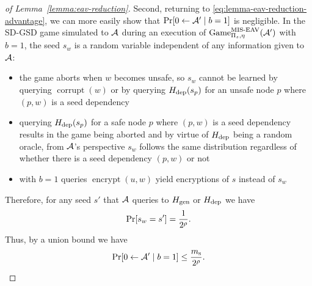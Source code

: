 \begin{proof}[of Lemma~\ref{lemma:eav-reduction}]
	Second, returning to \eqref{eq:lemma-eav-reduction-advantage}, we can more easily show that $\pr{0 \from \adv' \mid b = 1}$ is negligible. In the SD-GSD game simulated to $\mathcal{A}$ during an execution of $\mathrm{Game}_{\Pi_s, \eta}^{\mathrm{MIS\text{-}EAV}}(\mathcal{A}')$ with $b = 1$, the seed $s_w$ is a random variable independent of any information given to $\mathcal{A}$:
	\begin{itemize}
		\item the game aborts when $w$ becomes unsafe, so $s_w$ cannot be learned by querying $\operatorname{corrupt}(w)$ or by querying $H_\mathrm{dep}(s_p)$ for an unsafe node $p$ where $(p, w)$ is a seed dependency
		\item querying $H_\mathrm{dep}(s_p)$ for a safe node $p$ where $(p, w)$ is a seed dependency results in the game being aborted and by virtue of $H_\mathrm{dep}$ being a random oracle, from $\mathcal{A}$'s perspective $s_w$ follows the same distribution regardless of whether there is a seed dependency $(p, w)$ or not
		\item with $b = 1$ queries $\operatorname{encrypt}(u, w)$ yield encryptions of $s$ instead of $s_w$
	\end{itemize}
	Therefore, for any seed $s'$ that $\mathcal{A}$ queries to $H_\mathrm{gen}$ or $H_\mathrm{dep}$ we have
	\[
		\pr{s_w = s'} = \frac{1}{2^\rho}.
	\]
	Thus, by a union bound we have
	\begin{equation} \label{eq:lemma-eav-reduction-b=1}
		\pr{0 \from \adv' \mid b = 1} \le \frac{\ms}{2^\rho}.
	\end{equation}


\end{proof}
